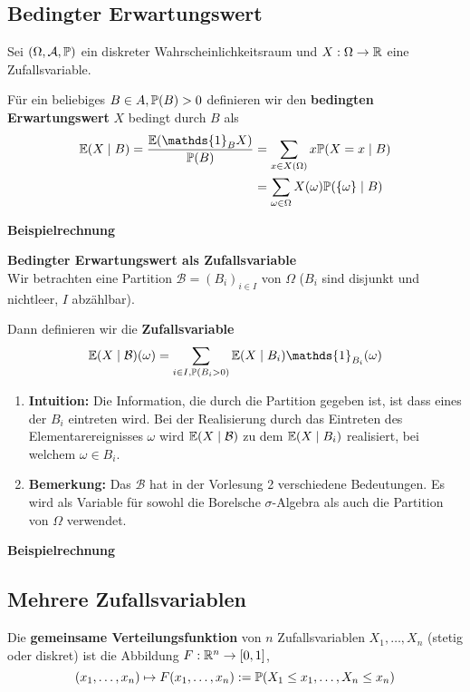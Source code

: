 \subsection{Bedingter Erwartungswert}
Sei $(\Omega, \A, \P)$ ein diskreter Wahrscheinlichkeitsraum und $X:\Omega \to \R$ eine Zufallsvariable. 

Für ein beliebiges $B \in A, \P(B) > 0$ definieren wir den \textbf{bedingten Erwartungswert} $X$ bedingt durch $B$ als
\begin{align*}
    \E(X \mid B) = \frac{\E(\mathds{1}_B X)}{\P(B)} &= \sum_{x \in X(\Omega)}x\P(X = x\mid B)\\ 
    &= \sum_{\omega \in \Omega}X(\omega)\P(\{\omega\}\mid B)
\end{align*}

\textbf{Beispielrechnung}


\textbf{Bedingter Erwartungswert als Zufallsvariable}\\
Wir betrachten eine Partition $\mathcal{B} = (B_i)_{i \in I}$ von $\Omega$ ($B_i$ sind disjunkt und nichtleer, $I$ abzählbar). 

Dann definieren wir die \textbf{Zufallsvariable}
$$\E(X \mid \mathcal{B})(\omega) = \sum_{i \in I, \P(B_i > 0)} \E(X \mid B_i) \mathds{1}_{B_i}(\omega)$$ 
\begin{enumerate}
    \item \textbf{Intuition:} Die Information, die durch die Partition gegeben ist, ist dass eines der $B_i$ eintreten wird. Bei der Realisierung durch das Eintreten des Elementarereignisses $\omega$ wird $\E(X \mid \mathcal{B})$ zu dem $\E(X \mid B_i)$ realisiert, bei welchem $\omega \in B_i$.
    \item \textbf{Bemerkung:} Das $\mathcal{B}$ hat in der Vorlesung 2 verschiedene Bedeutungen. Es wird als Variable für sowohl die Borelsche $\sigma$-Algebra als auch die Partition von $\Omega$ verwendet.
\end{enumerate}
\textbf{Beispielrechnung}

\subsection{Mehrere Zufallsvariablen}
Die \textbf{gemeinsame Verteilungsfunktion} von $n$ Zufallsvariablen $X_1, \ldots, X_n$ (stetig oder diskret) ist die Abbildung $F: \R^n \to [0,1]$,
$$(x_1, \ldots, x_n) \mapsto F(x_1, \ldots, x_n) := \P(X_1 \leq x_1, \ldots, X_n \leq x_n)$$

